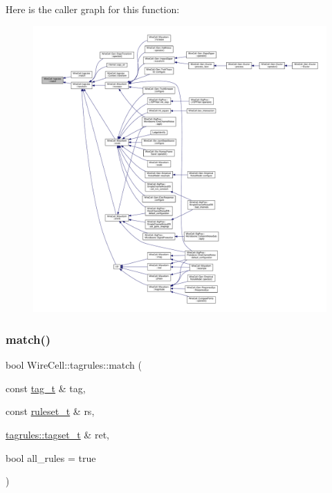 Here is the caller graph for this function\+:
\nopagebreak
\begin{figure}[H]
\begin{center}
\leavevmode
\includegraphics[width=350pt]{namespace_wire_cell_1_1tagrules_aed120ffc74c8d10ff4498490ec742f87_icgraph}
\end{center}
\end{figure}
\mbox{\label{namespace_wire_cell_1_1tagrules_a307c2349fd136058ba33924faff92553}} 
\subsubsection{\texorpdfstring{match()}{match()}\hspace{0.1cm}{\footnotesize\ttfamily [2/2]}}
{\footnotesize\ttfamily bool Wire\+Cell\+::tagrules\+::match (\begin{DoxyParamCaption}\item[{const \hyperlink{namespace_wire_cell_1_1tagrules_ae74af6e8edaf0f64b70f6df4e0b66cdc}{tag\+\_\+t} \&}]{tag,  }\item[{const \hyperlink{namespace_wire_cell_1_1tagrules_a93f5672d7c60d5f990b42dd93fd0aee2}{ruleset\+\_\+t} \&}]{rs,  }\item[{\hyperlink{namespace_wire_cell_1_1tagrules_a80263165e3d13e49e317c045829f76cb}{tagrules\+::tagset\+\_\+t} \&}]{ret,  }\item[{bool}]{all\+\_\+rules = {\ttfamily true} }\end{DoxyParamCaption})}



